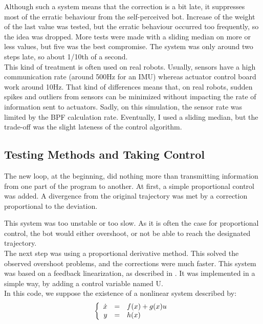 Although such a system means that the correction is a bit late, it suppresses most of the erratic behaviour from the self-perceived bot.
Increase of the weight of the last value was tested, but the erratic behaviour occurred too frequently, so the idea was dropped.
More tests were made with a sliding median on more or less values, but five was the best compromise.
The system was only around two steps late, so about 1/10th of a second.\\

This kind of treatment is often used on real robots.
Usually, sensors have a high communication rate (around 500Hz for an IMU) whereas actuator control board work around 10Hz.
That kind of differences means that, on real robots, sudden spikes and outliers from sensors can be minimized without impacting the rate of information sent to actuators.
Sadly, on this simulation, the sensor rate was limited by the BPF calculation rate.
Eventually, I used a sliding median, but the trade-off was the slight lateness of the control algorithm.\\

\subsection{Testing Methods and Taking Control}

The new loop, at the beginning, did nothing more than transmitting information from one part of the program to another.
At first, a simple proportional control was added. A divergence from the original trajectory was met by a correction proportional to the deviation.

This system was too unstable or too slow.
As it is often the case for proportional control, the bot would either overshoot, or not be able to reach the designated trajectory.\\

The next step was using a proportional derivative method. This solved the observed overshoot problems, and the corrections were much faster.
This system was based on a feedback linearization, as described in \parencite{ROBMOOC}.
It was implemented in a simple way, by adding a control variable named U.\\



In this code, we suppose the existence of a nonlinear system described by:\\

\begin{equation}
\left \{
\begin{array}{r c l}
   \dot{x} & = & f(x) + g(x)u \\
   y & = & h(x)
\end{array}
\right .
\end{equation}

